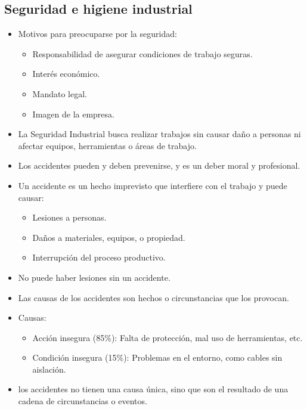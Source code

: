 \documentclass{article} %
\begin{document}
\subsection{Seguridad e higiene industrial}
\begin{itemize}
    \item Motivos para preocuparse por la seguridad:
    \begin{itemize}
        \item Responsabilidad de asegurar condiciones de trabajo seguras.
        \item Interés económico.
        \item Mandato legal.
        \item Imagen de la empresa.
    \end{itemize}
    \item La Seguridad Industrial busca realizar trabajos sin causar daño a personas ni afectar equipos, herramientas o áreas de trabajo.
    \item Los accidentes pueden y deben prevenirse, y es un deber moral y profesional.
    \item Un accidente es un hecho imprevisto que interfiere con el trabajo y puede causar:
    \begin{itemize}
        \item Lesiones a personas.
        \item Daños a materiales, equipos, o propiedad.
        \item Interrupción del proceso productivo.
    \end{itemize}
\end{itemize}
\begin{itemize}
    \item No puede haber lesiones sin un accidente.
    \item Las causas de los accidentes son hechos o circunstancias que los provocan.
    \item Causas:
    \begin{itemize}
        \item Acción insegura (85\%): Falta de protección, mal uso de herramientas, etc.
        \item Condición insegura (15\%): Problemas en el entorno, como cables sin aislación.
    \end{itemize}
    \item los accidentes no tienen una causa única, sino que son el resultado de una cadena de circunstancias o eventos.
\end{itemize}
\end{document}
